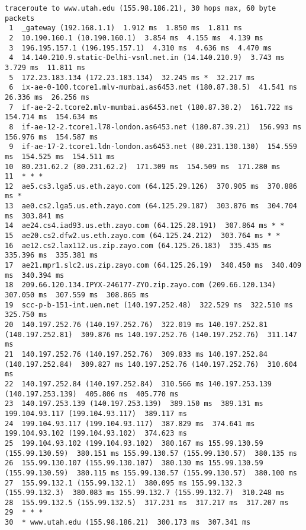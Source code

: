 \documentclass[a4paper]{article}
\begin{document}
\begin{enumerate}
\begin{lstlisting}
traceroute to www.utah.edu (155.98.186.21), 30 hops max, 60 byte packets
 1  _gateway (192.168.1.1)  1.912 ms  1.850 ms  1.811 ms
 2  10.190.160.1 (10.190.160.1)  3.854 ms  4.155 ms  4.139 ms
 3  196.195.157.1 (196.195.157.1)  4.310 ms  4.636 ms  4.470 ms
 4  14.140.210.9.static-Delhi-vsnl.net.in (14.140.210.9)  3.743 ms  3.729 ms  11.811 ms
 5  172.23.183.134 (172.23.183.134)  32.245 ms *  32.217 ms
 6  ix-ae-0-100.tcore1.mlv-mumbai.as6453.net (180.87.38.5)  41.541 ms  26.336 ms  26.256 ms
 7  if-ae-2-2.tcore2.mlv-mumbai.as6453.net (180.87.38.2)  161.722 ms  154.714 ms  154.634 ms
 8  if-ae-12-2.tcore1.l78-london.as6453.net (180.87.39.21)  156.993 ms  156.976 ms  154.587 ms
 9  if-ae-17-2.tcore1.ldn-london.as6453.net (80.231.130.130)  154.559 ms  154.525 ms  154.511 ms
10  80.231.62.2 (80.231.62.2)  171.309 ms  154.509 ms  171.280 ms
11  * * *
12  ae5.cs3.lga5.us.eth.zayo.com (64.125.29.126)  370.905 ms  370.886 ms *
13  ae0.cs2.lga5.us.eth.zayo.com (64.125.29.187)  303.876 ms  304.704 ms  303.841 ms
14  ae24.cs4.iad93.us.eth.zayo.com (64.125.28.191)  307.864 ms * *
15  ae20.cs2.dfw2.us.eth.zayo.com (64.125.24.212)  303.764 ms * *
16  ae12.cs2.lax112.us.zip.zayo.com (64.125.26.183)  335.435 ms  335.396 ms  335.381 ms
17  ae21.mpr1.slc2.us.zip.zayo.com (64.125.26.19)  340.450 ms  340.409 ms  340.394 ms
18  209.66.120.134.IPYX-246177-ZYO.zip.zayo.com (209.66.120.134)  307.050 ms  307.559 ms  308.865 ms
19  scc-p-b-151-int.uen.net (140.197.252.48)  322.529 ms  322.510 ms  325.750 ms
20  140.197.252.76 (140.197.252.76)  322.019 ms 140.197.252.81 (140.197.252.81)  309.876 ms 140.197.252.76 (140.197.252.76)  311.147 ms
21  140.197.252.76 (140.197.252.76)  309.833 ms 140.197.252.84 (140.197.252.84)  309.827 ms 140.197.252.76 (140.197.252.76)  310.604 ms
22  140.197.252.84 (140.197.252.84)  310.566 ms 140.197.253.139 (140.197.253.139)  405.806 ms  405.770 ms
23  140.197.253.139 (140.197.253.139)  389.150 ms  389.131 ms 199.104.93.117 (199.104.93.117)  389.117 ms
24  199.104.93.117 (199.104.93.117)  387.829 ms  374.641 ms 199.104.93.102 (199.104.93.102)  374.623 ms
25  199.104.93.102 (199.104.93.102)  380.167 ms 155.99.130.59 (155.99.130.59)  380.151 ms 155.99.130.57 (155.99.130.57)  380.135 ms
26  155.99.130.107 (155.99.130.107)  380.130 ms 155.99.130.59 (155.99.130.59)  380.115 ms 155.99.130.57 (155.99.130.57)  380.100 ms
27  155.99.132.1 (155.99.132.1)  380.095 ms 155.99.132.3 (155.99.132.3)  380.083 ms 155.99.132.7 (155.99.132.7)  310.248 ms
28  155.99.132.5 (155.99.132.5)  317.231 ms  317.217 ms  317.207 ms
29  * * *
30  * www.utah.edu (155.98.186.21)  300.173 ms  307.341 ms


\end{lstlisting}
\end{enumerate}
\end{document}
